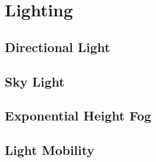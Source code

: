 \section{Lighting}
\subsection{Directional Light}
\subsection{Sky Light}
\subsection{Exponential Height Fog}
\subsection{Light Mobility}
